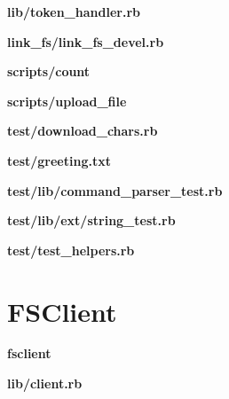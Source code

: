 \textbf{lib/token\_handler.rb}

\textbf{link\_fs/link\_fs\_devel.rb}

\textbf{scripts/count}

\textbf{scripts/upload\_file}

\textbf{test/download\_chars.rb}

\textbf{test/greeting.txt}

\textbf{test/lib/command\_parser\_test.rb}

\textbf{test/lib/ext/string\_test.rb}

\textbf{test/test\_helpers.rb}





\section{FSClient}
\textbf{fsclient}

\textbf{lib/client.rb}


